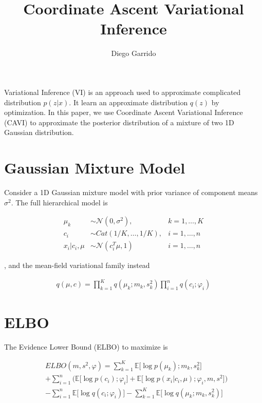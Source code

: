\documentclass{article}
\title{Coordinate Ascent Variational Inference}
\author{Diego Garrido}
\begin{document}
\maketitle


Variational Inference (VI) is an approach used to approximate complicated distribution $p(z|x)$. It learn an approximate distribution $q(z)$ by optimization. In this paper, we use Coordinate Ascent Variational Inference (CAVI) to approximate the posterior distribution of a mixture of two 1D Gaussian distribution.

\href{https://nbviewer.jupyter.org/github/dgarridoa/CAVI/blob/main/CAVI.ipynb}{\color{blue}{Jupyter Notebook}}

\section{Gaussian Mixture Model}

Consider a 1D Gaussian mixture model with prior variance of component means $\sigma^{2}$. The full hierarchical model is

\begin{align}
    \mu_{k} &\sim \mathcal{N}(0, \sigma^{2}), & k=1,\ldots, K\\
    c_{i} &\sim Cat(1/K, \ldots, 1/K), & i=1, \ldots, n\\
    x_{i}|c_{i}, \mu &\sim \mathcal{N}(c_{i}^{T}\mu, 1) & i=1, \ldots, n
\end{align}


, and the mean-field variational family instead

\begin{align}
q(\mu, c) = \prod_{k=1}^{K}q(\mu_{k};m_{k}, s_{k}^{2})\prod_{i=1}^{n}q(c_{i};\varphi_{i})
\end{align}

\section{ELBO}

The Evidence Lower Bound (ELBO) to maximize is

\begin{align}
    &ELBO(m, s^{2}, \varphi) = \sum_{k=1}^{K}\mathbb{E}\big[\log p(\mu_{k});m_{k}, s_{k}^{2}\big]\\
    &+\sum_{i=1}^{n}\bigg(\mathbb{E}\big[\log p(c_{i});\varphi_{i}\big]+\mathbb{E}\big[\log p(x_{i}|c_{i}, \mu);\varphi_{i},m, s^{2}\big]\bigg)\\
    &-\sum_{i=1}^{n}\mathbb{E}\big[\log q(c_{i};\varphi_{i})]-\sum_{k=1}^{K}\mathbb{E}\big[\log q(\mu_{k};m_{k}, s_{k}^{2})]
\end{align}
\end{document}
